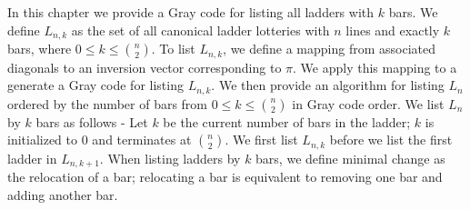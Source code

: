 In this chapter we provide a Gray code for listing all ladders with $k$ bars. 
We define $L_{n,k}$ as the set of all canonical ladder lotteries with $n$ lines and exactly $k$ bars, where $0 \leq k \leq {n \choose 2}$. To list $L_{n,k}$, 
we define a mapping from associated diagonals to 
an inversion vector corresponding to $\pi$. We apply this mapping to a generate a Gray code for listing $L_{n,k}$. 
We then provide an algorithm for listing $L_{n}$ ordered by the number of bars from $0 \leq k \leq {n \choose 2}$ in Gray code order. 
We list $L_{n}$ by $k$ bars as follows - Let $k$ be the current number of bars in the ladder; $k$ is initialized to $0$ and terminates at ${n \choose 2}$. 
We first list $L_{n,k}$ before we list the first ladder in $L_{n, k+1}$. When listing ladders by $k$ 
bars, we define minimal change as the relocation 
of a bar; relocating a bar is equivalent to removing one bar and adding another bar.  



